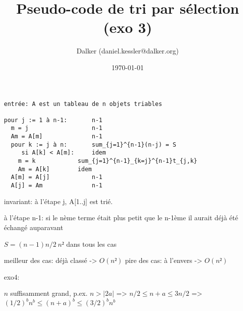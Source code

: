 \documentclass[11pt]{article}
\author{Dalker (daniel.kessler@dalker.org)}
\date{\today}
\title{Pseudo-code de tri par sélection (exo 3)}
\begin{document}
\maketitle
\tableofcontents

\begin{verbatim}
entrée: A est un tableau de n objets triables

pour j := 1 à n-1:       n-1
  m = j                  n-1
  Am = A[m]              n-1
  pour k := j à n:       sum_{j=1}^{n-1}(n-j) = S
     si A[k] < A[m]:     idem
	m = k            sum_{j=1}^{n-1}_{k=j}^{n-1}t_{j,k}
	Am = A[k]        idem
  A[m] = A[j]            n-1
  A[j] = Am              n-1
\end{verbatim}

invariant: à l'étape j, A[1..j] est trié.

à l'étape n-1: si le nème terme était plus petit que le n-1ème il aurait déjà
été échangé auparavant

\(S = (n-1)n/2 ~ n²\) dans tous les cas

meilleur des cas: déjà classé
-> \(O(n²)\)
pire des cas: à l'envers
-> \(O(n²)\)

exo4:

\(n\) suffisamment grand, p.ex. \(n > |2a|\) => \(n/2 \leq n+a \leq 3n/2\)
=> \((1/2)^b n^b \leq (n+a)^b \leq (3/2)^b n^b\)
\end{document}
